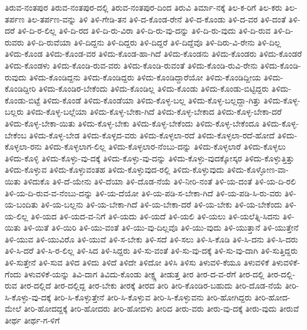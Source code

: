 {ತಿರುವ-ನಂತಪುರ
ತಿರುವ-ನಂತಪುರ-ದಲ್ಲಿ
ತಿರುವ-ನಂತಪುರ-ದಿಂದ
ತಿರುವಿ
ತಿರ್ಮಾ-ನಕ್ಕೆ
ತಿಲ-ಕ-ರಿಗೆ
ತಿಲ-ಕರು
ತಿಲ-ತರ್ಪಣ
ತಿಲ-ತರ್ಪಣ-ವನ್ನು
ತಿಳಿ
ತಿಳಿ-ಗೇಡಿ-ತನ
ತಿಳಿ-ದ-ಕೊಂಡ-ರೇನೆ
ತಿಳಿ-ದ-ಕೊಂಡು
ತಿಳಿ-ದ-ವರ
ತಿಳಿ-ದಂತೆ
ತಿಳಿ-ದರೆ
ತಿಳಿ-ದಿ-ರ-ಲಿಲ್ಲ
ತಿಳಿ-ದಿ-ರದ
ತಿಳಿ-ದಿ-ರು-ವಿರಾ
ತಿಳಿ-ದಿ-ರು-ವು-ದನ್ನು
ತಿಳಿ-ದಿ-ರು-ವುದು
ತಿಳಿ-ದಿ-ರುವ
ತಿಳಿ-ದಿ-ರುವರು
ತಿಳಿ-ದಿ-ರುವೆಯಾ
ತಿಳಿ-ದಿದ್ದನು
ತಿಳಿ-ದಿದ್ದರು
ತಿಳಿ-ದಿದ್ದರೆ
ತಿಳಿ-ದಿದ್ದೆವೊ
ತಿಳಿ-ದಿರು-ವಿ-ರೇನು
ತಿಳಿ-ದಿಲ್ಲ
ತಿಳಿದು-ಕೊಂಡ
ತಿಳಿದು-ಕೊಂಡ-ವರ
ತಿಳಿದು-ಕೊಂಡ-ಹಾ-ಗಿದೆ
ತಿಳಿದು-ಕೊಂಡನು
ತಿಳಿದು-ಕೊಂಡರು
ತಿಳಿದು-ಕೊಂಡರೆ
ತಿಳಿದು-ಕೊಂಡಳು
ತಿಳಿದು-ಕೊಂಡಿ-ರುವ-ವರು
ತಿಳಿದು-ಕೊಂಡಿ-ರುವಂತೆ
ತಿಳಿದು-ಕೊಂಡಿ-ರುವಿ-ರೇನು
ತಿಳಿದು-ಕೊಂಡಿ-ರುವುದು
ತಿಳಿದು-ಕೊಂಡಿದ್ದನು
ತಿಳಿದು-ಕೊಂಡಿದ್ದರು
ತಿಳಿದು-ಕೊಂಡಿದ್ದಾರೆಯೋ
ತಿಳಿದು-ಕೊಂಡಿದ್ದೀಯ
ತಿಳಿದು-ಕೊಂಡಿದ್ದೀರಿ
ತಿಳಿದು-ಕೊಂಡಿರ-ಬೇಕೆಂದು
ತಿಳಿದು-ಕೊಂಡಿಲ್ಲ
ತಿಳಿದು-ಕೊಂಡು
ತಿಳಿದು-ಕೊಂಡು-ಬಿಟ್ಟಿದ್ದರು
ತಿಳಿದು-ಕೊಂಡು-ಬಿಟ್ಟೆ
ತಿಳಿದು-ಕೊಂಡೆ
ತಿಳಿದು-ಕೊಂಡೆಯಾ
ತಿಳಿದು-ಕೊಳ್ಳ-ಬಲ್ಲ
ತಿಳಿದು-ಕೊಳ್ಳ-ಬಲ್ಲದ್ದಾ-ಗಿತ್ತು
ತಿಳಿದು-ಕೊಳ್ಳ-ಬಲ್ಲರು
ತಿಳಿದು-ಕೊಳ್ಳ-ಬಲ್ಲೆಯಾ
ತಿಳಿದು-ಕೊಳ್ಳ-ಬೇಕಾ-ಗಿದೆ
ತಿಳಿದು-ಕೊಳ್ಳ-ಬೇಕಾದ
ತಿಳಿದು-ಕೊಳ್ಳ-ಬೇಕಾ-ದರೆ
ತಿಳಿದು-ಕೊಳ್ಳ-ಬೇಕಾ-ಯಿತು
ತಿಳಿದು-ಕೊಳ್ಳ-ಬೇಕು
ತಿಳಿದು-ಕೊಳ್ಳ-ಬೇಕೆಂದು
ತಿಳಿದು-ಕೊಳ್ಳ-ಬೇಕೆಂದೂ
ತಿಳಿದು-ಕೊಳ್ಳ-ಬೇಕೆಂಬ
ತಿಳಿದು-ಕೊಳ್ಳ-ಬೇಡ
ತಿಳಿದು-ಕೊಳ್ಳದ-ವರು
ತಿಳಿದು-ಕೊಳ್ಳಲಾ-ರದೆ
ತಿಳಿದು-ಕೊಳ್ಳಲಾ-ರದೆ-ಹೋದೆ
ತಿಳಿದು-ಕೊಳ್ಳಲಾ-ರನು
ತಿಳಿದು-ಕೊಳ್ಳಲಾಗ-ಲಿಲ್ಲ
ತಿಳಿದು-ಕೊಳ್ಳಲಾರ-ನೆಂಬು-ದನ್ನು
ತಿಳಿದು-ಕೊಳ್ಳಲಾರೆ
ತಿಳಿದು-ಕೊಳ್ಳಲು
ತಿಳಿದು-ಕೊಳ್ಳಿ
ತಿಳಿದು-ಕೊಳ್ಳು-ವು-ದಕ್ಕೆ
ತಿಳಿದು-ಕೊಳ್ಳು-ವು-ದನ್ನು
ತಿಳಿದು-ಕೊಳ್ಳು-ವುದಕ್ಕೋಸ್ಕರ
ತಿಳಿದು-ಕೊಳ್ಳುತ್ತಿತ್ತು
ತಿಳಿದು-ಕೊಳ್ಳುವ
ತಿಳಿದು-ಕೊಳ್ಳುವಂತಹ
ತಿಳಿದು-ಕೊಳ್ಳುವುದ-ರಲ್ಲಿ
ತಿಳಿದು-ಕೊಳ್ಳುವುದು
ತಿಳಿದು-ಕೊಳ್ಳೋಣ-ವಾ-ಯಿತು
ತಿಳಿದುಕೊ
ತಿಳಿ-ದೆ-ಯೇನು
ತಿಳಿ-ದೆಯಾ
ತಿಳಿ-ದೊಡ-ನೆಯೆ
ತಿಳಿ-ನೀರಿ-ನಂತೆ
ತಿಳಿ-ಯ-ದಂತೆ
ತಿಳಿ-ಯ-ದಿ-ರಲಿ
ತಿಳಿ-ಯ-ದಿ-ರುವ-ವ-ನೆಂಬು-ದನ್ನು
ತಿಳಿ-ಯ-ದೆಯೋ
ತಿಳಿ-ಯ-ಪಡಿ-ಸ-ಬೇಕಾ-ಗಿದೆ
ತಿಳಿ-ಯ-ಪಡಿ-ಸಿ-ರು-ವರು
ತಿಳಿ-ಯ-ಬಂದಿತು
ತಿಳಿ-ಯ-ಬಲ್ಲನು
ತಿಳಿ-ಯ-ಬೇಕಾ-ಗಿದೆ
ತಿಳಿ-ಯ-ಬೇಕಾ-ದರೆ
ತಿಳಿ-ಯ-ಬೇಕು
ತಿಳಿ-ಯ-ಬೇಕೆಂದು
ತಿಳಿ-ಯ-ಲಿಲ್ಲ
ತಿಳಿ-ಯದ
ತಿಳಿ-ಯದ-ವ-ನಿಗೆ
ತಿಳಿ-ಯದು
ತಿಳಿ-ಯದೆ
ತಿಳಿ-ಯಲಿ
ತಿಳಿ-ಯಲು
ತಿಳಿ-ಯಲೆತ್ನಿ-ಸಿದನು
ತಿಳಿ-ಯಿತು
ತಿಳಿ-ಯಿತೆ
ತಿಳಿ-ಯಿರಿ
ತಿಳಿ-ಯು-ವಂತೆ
ತಿಳಿ-ಯು-ವು-ದಿಲ್ಲವೊ
ತಿಳಿ-ಯು-ವುದು
ತಿಳಿ-ಯುತ್ತಾನೆ
ತಿಳಿ-ಯುತ್ತೇನೆ
ತಿಳಿ-ಯುವ
ತಿಳಿ-ಯುವಿರೊ
ತಿಳಿ-ಯುವೆ
ತಿಳಿ-ಸ-ಬೇಕು
ತಿಳಿ-ಸದೆ
ತಿಳಿ-ಸಲು
ತಿಳಿ-ಸಿ-ಕೊಡಿ
ತಿಳಿ-ಸಿ-ದನು
ತಿಳಿ-ಸಿ-ದರು
ತಿಳಿ-ಸಿ-ದರೆ
ತಿಳಿ-ಸಿ-ರ-ಲಿಲ್ಲ
ತಿಳಿ-ಸಿದ
ತಿಳಿ-ಸಿದ್ದರು
ತಿಳಿ-ಸು-ವಂತೆ
ತಿಳಿ-ಸು-ವು-ದಕ್ಕೆ
ತಿಳಿ-ಸು-ವು-ದಾಗಿ
ತಿಳಿ-ಸುತ್ತಿದ್ದರು
ತಿಳಿ-ಸುತ್ತೇನೆ
ತಿಳಿ-ಸುವ
ತಿಳಿದ
ತಿಳಿದು
ತಿಳಿದೆ
ತಿಳಿದೇ
ತಿಳಿದೋ
ತಿಳಿಸಿ
ತಿಳಿಸು
ತಿಳುವಳಿ-ಕೆಯೂ
ತಿಳುವಳಿಕೆ
ತಿಳುವಳಿಕೆ-ಗೆಂದು
ತಿಳುವಳಿಕೆ-ಯನ್ನು
ತಿವಿ-ದಾಗ
ತಿವಿದು-ಕೊಂಡು
ತೀಕ್ಷ್ಣ
ತೀಡುತ್ತ
ತೀರ
ತೀರ-ದ-ವ-ರೆಗೆ
ತೀರ-ದಲ್ಲಿ
ತೀರ-ದಲ್ಲಿ-ರುವ
ತೀರ-ದಲ್ಲಿದೆ
ತೀರ-ದಲ್ಲಿದ್ದ
ತೀರ-ಬೇಕು
ತೀರಕ್ಕೆ
ತೀರದ
ತೀರಿ
ತೀರಿ-ಕೊಂಡಿರ-ಬಹುದು
ತೀರಿ-ದೊಡ-ನೆಯೆ
ತೀರಿ-ಸಿ-ಕೊಳ್ಳು-ವು-ದಕ್ಕೆ
ತೀರಿ-ಸಿ-ಕೊಳ್ಳುತ್ತೇನೆ
ತೀರಿ-ಸಿ-ಕೊಳ್ಳುವ
ತೀರಿ-ಸಿ-ಕೊಳ್ಳುವನು
ತೀರಿ-ಹೋಗಿದ್ದರು
ತೀರಿ-ಹೋದ-ಮೇಲೆ
ತೀರಿ-ಹೋದದ್ದಕ್ಕೆ
ತೀರಿ-ಹೋದರು
ತೀರಿ-ಹೋದಳು
ತೀರಿದ
ತೀರು-ವರು
ತೀರು-ವು-ದಕ್ಕೆ
ತೀರು-ವುದು
ತೀರುವೆ
ತೀರ್ಥ
ತೀರ್ಥ-ಗ-ಳಿಗೆ
}
